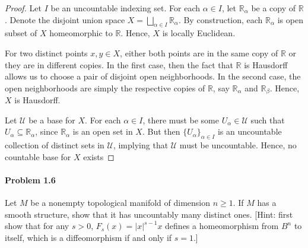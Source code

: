 \documentclass[12pt]{article}
\newlength{\myparskip}
\newenvironment{fullbox}{\begin{lrbox}{\savefullbox}\begin{minipage}{\dimexpr\textwidth-2\fboxsep\relax}\setlength{\parskip}{\myparskip}}{\end{minipage}\end{lrbox}\framebox[\textwidth]{\usebox{\savefullbox}}}
\newenvironment{pbox}[1][]{\begin{fullbox}\def\temp{#1}\ifx\temp\empty\else\paragraph{#1}\phantom{}\fi}{\end{fullbox}}
\theoremstyle{definition}
\newcommand{\R}{\mathbb{R}}
\newcommand{\<}{\langle}
\renewcommand{\>}{\rangle}
\newcommand{\seq}{\subseteq}
\newcommand{\UU}{\mathcal{U}}
\begin{document}
\begin{proof}
    Let $I$ be an uncountable indexing set.
    For each $\alpha \in I$, let $\R_\alpha$ be a copy of $\R$.
    Denote the disjoint union space $X = \bigsqcup_{\alpha \in I} \R_\alpha$.
    By construction, each $\R_\alpha$ is open subset of $X$ homeomorphic to $\R$.
    Hence, $X$ is locally Euclidean.

    For two distinct points $x, y \in X$, either both points are in the same copy of $\R$ or they are in different copies.
    In the first case, then the fact that $\R$ is Hausdorff allows us to choose a pair of disjoint open neighborhoods.
    In the second case, the open neighborhoods are simply the respective copies of $\R$, say $\R_\alpha$ and $\R_\beta$.
    Hence, $X$ is Hausdorff.

    Let $\UU$ be a base for $X$.
    For each $\alpha \in I$, there must be some $U_\alpha \in \UU$ such that $U_\alpha \seq \R_\alpha$, since $\R_\alpha$ is an open set in $X$.
    But then $\{U_\alpha\}_{\alpha \in I}$ is an uncountable collection of distinct sets in $\UU$, implying that $\UU$ must be uncountable.
    Hence, no countable base for $X$ exists
\end{proof}


\newpage
\begin{pbox}[Problem 1.6]
    Let $M$ be a nonempty topological manifold of dimension $n \geq 1$.
    If $M$ has a smooth structure, show that it has uncountably many distinct ones.
    [Hint: first show that for any $s > 0$, $F_s(x) = |x|^{s - 1}x$ defines a homeomorphism from $B^n$ to itself, which is a diffeomorphism if and only if $s = 1$.]
\end{pbox}
\end{document}
